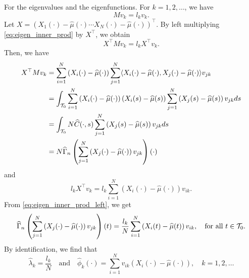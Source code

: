 For the eigenvalues and the eigenfunctions. For $k =1, 2, \dots$, we have
\begin{equation}\label{eq:eigen_inner_prod}
    Mv_k = l_kv_k.
\end{equation}
Let $X = \left(X_1(\cdot) - \widehat{\mu}(\cdot) \cdots X_N(\cdot) - \widehat{\mu}(\cdot)\right)^\top$.
By left multiplying \eqref{eq:eigen_inner_prod} by $X^\top$, we obtain 
\begin{equation}\label{eq:eigen_inner_prod_left}
X^\top M v_k = l_k X^\top v_k.
\end{equation} 
Then, we have
\begin{align}
X^\top M v_k &= \sum_{i = 1}^N \left(X_i(\cdot) - \widehat{\mu}(\cdot)\right) \sum_{j = 1}^N \langle X_i(\cdot) - \widehat{\mu}(\cdot), X_j(\cdot) - \widehat{\mu}(\cdot)\rangle v_{jk} \\
    &= \int_{\mathcal{T}_{0}} \sum_{i = 1}^N \left(X_i(\cdot) - \widehat{\mu}(\cdot)\right) \left(X_i(s) - \widehat{\mu}(s)\right) \sum_{j = 1}^N \left(X_j(s) - \widehat{\mu}(s)\right) v_{jk} ds \\
    &= \int_{\mathcal{T}_{0}} N\widehat{C}(\cdot, s) \sum_{j = 1}^N \left(X_j(s) - \widehat{\mu}(s)\right) v_{jk} ds \\
    &= N \widehat{\Gamma}_n\left(\sum_{j = 1}^N \left(X_j(\cdot) - \widehat{\mu}(\cdot)\right) v_{jk}\right)(\cdot)
\end{align}
and
\begin{equation}
    l_k X^\top v_k = l_k \sum_{i = 1}^N \left(X_i(\cdot) - \widehat{\mu}(\cdot)\right)v_{ik}.
\end{equation}
From \eqref{eq:eigen_inner_prod_left}, we get
\begin{equation}
    \widehat{\Gamma}_n\left(\sum_{j = 1}^N \left(X_j(\cdot) - \widehat{\mu}(\cdot)\right) v_{jk}\right)(t) = \frac{l_k}{N} \sum_{i = 1}^N \left(X_i(t) - \widehat{\mu}(t)\right)v_{ik}, \quad\text{for all}~ t \in \mathcal{T}_{0}.
\end{equation}
By identification, we find that
\begin{equation}
\widehat{\lambda}_k = \frac{l_k}{N} \quad\text{and}\quad \widehat{\phi}_k(\cdot) = \sum_{i = 1}^N v_{ik}(X_i(\cdot) - \widehat{\mu}(\cdot)), \quad k = 1, 2, \dots
\end{equation}

